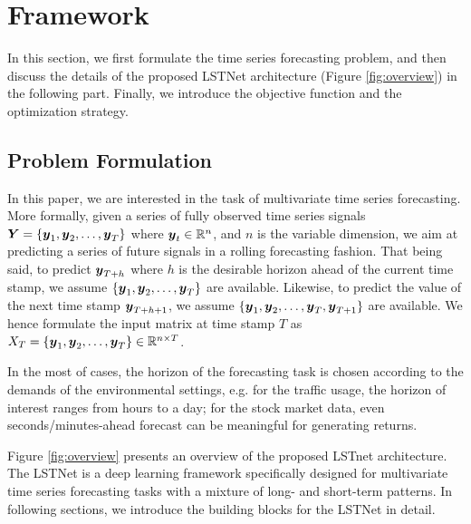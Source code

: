 \section{Framework}
\label{sec:model}

In this section, we first formulate the time series forecasting problem, and then discuss the details of the proposed LSTNet architecture (Figure \ref{fig:overview}) in the following part. Finally, we introduce the objective function and the optimization strategy.
\subsection{Problem Formulation}
\label{sec:format}

In this paper, we are interested in the task of multivariate time series forecasting. More formally, given a series of fully observed time series signals ${\boldsymbol Y} = \{{\boldsymbol y}_1, {\boldsymbol y}_2, \ldots, {\boldsymbol y}_T \}$ where ${\boldsymbol y}_t \in {\mathbb{R}}^n$, and $n$ is the variable dimension, we aim at predicting a series of future signals in a rolling forecasting fashion. That being said, to predict ${\boldsymbol y}_{T+h}$ where $h$ is the desirable horizon ahead of the current time stamp, we assume $\{ {\boldsymbol y}_1, {\boldsymbol y}_2, \ldots, {\boldsymbol y}_T \}$ are available. Likewise, to predict the  value of the next time stamp ${\boldsymbol y}_{T+h+1}$, we assume $\{ {\boldsymbol y}_1, {\boldsymbol y}_2, \ldots, {\boldsymbol y}_T, {\boldsymbol y}_{T+1}\}$ are available. We hence formulate the input matrix at time stamp $T$ as $X_T = \{ {\boldsymbol y}_1, {\boldsymbol y}_2, \ldots, {\boldsymbol y}_T\} \in {\mathbb{R}}^{n \times T}$. 

In the most of cases, the horizon of the forecasting task is chosen according to the demands of the environmental settings, e.g. for the traffic usage, the horizon of interest ranges from hours to a day; for the stock market data, even seconds/minutes-ahead forecast can be meaningful for generating returns.

Figure \ref{fig:overview} presents an overview of the proposed LSTnet architecture. The LSTNet is a deep learning framework specifically designed for multivariate time series forecasting tasks with a mixture of long- and short-term patterns. In following sections, we introduce the building blocks for the LSTNet in detail. 

